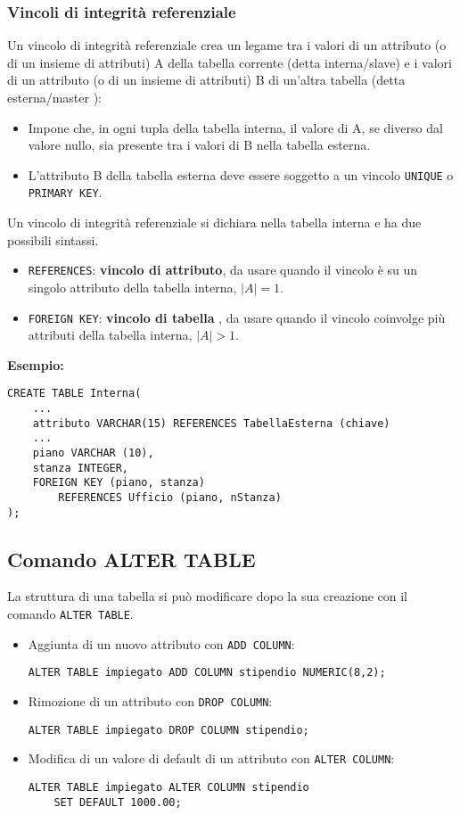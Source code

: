 \documentclass[a4paper, 10pt, titlepage]{article}
\begin{document}
	\subsubsection{Vincoli di integrità referenziale}
	Un vincolo di integrità referenziale crea un legame tra i valori di un attributo (o di un insieme di attributi) A della tabella corrente (detta 
	interna/slave) e i valori di un attributo (o di un insieme di attributi) B di
un’altra tabella (detta esterna/master ):
\begin{itemize}
\item Impone che, in ogni tupla della tabella interna, il valore di A, se diverso
dal valore nullo, sia presente tra i valori di B nella tabella esterna.
\item L’attributo B della tabella esterna deve essere soggetto a un vincolo \lstinline|UNIQUE| o \lstinline|PRIMARY KEY|.
\end{itemize}
		Un vincolo di integrità referenziale si dichiara nella tabella interna e ha
		due possibili sintassi.
		\begin{itemize}
			\item \lstinline|REFERENCES|: \textbf{vincolo di attributo}, da usare quando il vincolo è su un
			singolo attributo della tabella interna, $ |A| = 1 $.
			\item \lstinline|FOREIGN KEY|: \textbf{vincolo di tabella} , da usare quando il vincolo coinvolge più attributi della tabella interna, $ |A| > 1 $.
		\end{itemize}
		\textbf{Esempio:}
		\begin{lstlisting}
CREATE TABLE Interna(
	...
	attributo VARCHAR(15) REFERENCES TabellaEsterna (chiave)
	...
	piano VARCHAR (10),
	stanza INTEGER,
	FOREIGN KEY (piano, stanza) 
		REFERENCES Ufficio (piano, nStanza)
);
		\end{lstlisting}
		
	\subsection{Comando ALTER TABLE}
		La struttura di una tabella si può modificare dopo la sua creazione con il
		comando \lstinline|ALTER TABLE|.
		\begin{itemize}
			\item Aggiunta di un nuovo attributo con \lstinline|ADD COLUMN|:
			\begin{lstlisting}
ALTER TABLE impiegato ADD COLUMN stipendio NUMERIC(8,2);
			\end{lstlisting}
			\item Rimozione di un attributo con \lstinline|DROP COLUMN|:
			\begin{lstlisting}
ALTER TABLE impiegato DROP COLUMN stipendio;
			\end{lstlisting}
			\item Modifica di un valore di default di un attributo con \lstinline|ALTER COLUMN|:
			\begin{lstlisting}
ALTER TABLE impiegato ALTER COLUMN stipendio
	SET DEFAULT 1000.00;
			\end{lstlisting}			
		\end{itemize}
		
\end{document}
